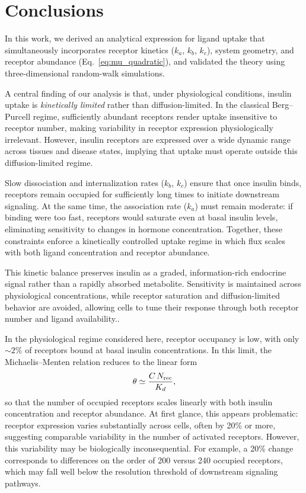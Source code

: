 \section{Conclusions}\label{sec:conclusions}
In this work, we derived an analytical expression for ligand uptake that simultaneously incorporates receptor kinetics ($k_a$, $k_b$, $k_c$), system geometry, and receptor abundance (Eq.~\eqref{eq:mu_quadratic}), and validated the theory using three-dimensional random-walk simulations.

A central finding of our analysis is that, under physiological conditions, insulin uptake is \textit{kinetically limited} rather than diffusion-limited.
In the classical Berg--Purcell regime, sufficiently abundant receptors render uptake insensitive to receptor number, making variability in receptor expression physiologically irrelevant.
However, insulin receptors are expressed over a wide dynamic range across tissues and disease states, implying that uptake must operate outside this diffusion-limited regime.

Slow dissociation and internalization rates ($k_b$, $k_c$) ensure that once insulin binds, receptors remain occupied for sufficiently long times to initiate downstream signaling.
At the same time, the association rate ($k_a$) must remain moderate: if binding were too fast, receptors would saturate even at basal insulin levels, eliminating sensitivity to changes in hormone concentration.
Together, these constraints enforce a kinetically controlled uptake regime in which flux scales with both ligand concentration and receptor abundance.

This kinetic balance preserves insulin as a graded, information-rich endocrine signal rather than a rapidly absorbed metabolite.
Sensitivity is maintained across physiological concentrations, while receptor saturation and diffusion-limited behavior are avoided, allowing cells to tune their response through both receptor number and ligand availability..

In the physiological regime considered here, receptor occupancy is low, with only $\sim 2\%$ of receptors bound at basal insulin concentrations.
In this limit, the Michaelis--Menten relation reduces to the linear form
\begin{equation}
    \theta \simeq \frac{C\,N_{\mathrm{rec}}}{K_d},
    \label{eq:theta_linear}
\end{equation}
so that the number of occupied receptors scales linearly with both insulin concentration and receptor abundance.
At first glance, this appears problematic: receptor expression varies substantially across cells, often by 20\% or more, suggesting comparable variability in the number of activated receptors.
However, this variability may be biologically inconsequential.
For example, a 20\% change corresponds to differences on the order of 200 versus 240 occupied receptors, which may fall well below the resolution threshold of downstream signaling pathways.

